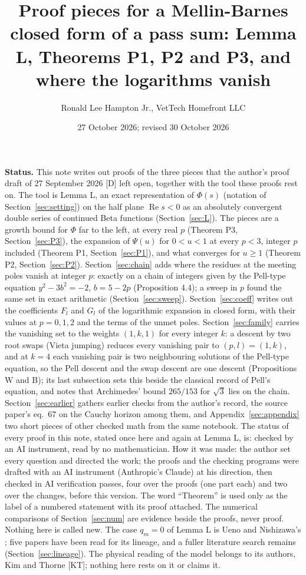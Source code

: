 \documentclass[11pt]{article}
\title{Proof pieces for a Mellin-Barnes closed form of a pass sum: Lemma L, Theorems P1, P2 and P3, and where the logarithms vanish}
\author{Ronald Lee Hampton Jr., VetTech Homefront LLC}
\date{27 October 2026; revised 30 October 2026}
\newcommand{\re}{\operatorname{Re}}
\begin{document}
\maketitle

\noindent\textbf{Status.} This note writes out proofs of the three pieces that the author's proof draft of 27 September 2026 [D] left open, together with the tool these proofs rest on. The tool is Lemma L, an exact representation of $\Phi(s)$ (notation of Section~\ref{sec:setting}) on the half plane $\re s<0$ as an absolutely convergent double series of continued Beta functions (Section~\ref{sec:L}). The pieces are a growth bound for $\Phi$ far to the left, at every real $p$ (Theorem P3, Section~\ref{sec:P3}), the expansion of $\Psi(u)$ for $0<u<1$ at every $p<3$, integer $p$ included (Theorem P1, Section~\ref{sec:P1}), and what converges for $u\ge1$ (Theorem P2, Section~\ref{sec:P2}). Section~\ref{sec:chain} adds where the residues at the meeting poles vanish at integer $p$: exactly on a chain of integers given by the Pell-type equation $y^2-3b^2=-2$, $b=5-2p$ (Proposition 4.4); a sweep in $p$ found the same set in exact arithmetic (Section~\ref{sec:sweep}). Section~\ref{sec:coeff} writes out the coefficients $F_l$ and $G_l$ of the logarithmic expansion in closed form, with their values at $p=0,1,2$ and the terms of the unmet poles. Section~\ref{sec:family} carries the vanishing set to the weights $(1,k,1)$ for every integer $k$: a descent by two root swaps (Vieta jumping) reduces every vanishing pair to $(p,l)=(1,k)$, and at $k=4$ each vanishing pair is two neighbouring solutions of the Pell-type equation, so the Pell descent and the swap descent are one descent (Propositions W and B); its last subsection sets this beside the classical record of Pell's equation, and notes that Archimedes' bound $265/153$ for $\sqrt3$ lies on the chain. Section~\ref{sec:earlier} gathers earlier checks from the author's record, the source paper's eq.~67 on the Cauchy horizon among them, and Appendix~\ref{sec:appendix} two short pieces of other checked math from the same notebook. The status of every proof in this note, stated once here and again at Lemma L, is: checked by an AI instrument, read by no mathematician. How it was made: the author set every question and directed the work; the proofs and the checking programs were drafted with an AI instrument (Anthropic's Claude) at his direction, then checked in AI verification passes, four over the proofs (one part each) and two over the changes, before this version. The word ``Theorem'' is used only as the label of a numbered statement with its proof attached. The numerical comparisons of Section~\ref{sec:num} are evidence beside the proofs, never proof. Nothing here is called new. The case $q_m=0$ of Lemma L is Ueno and Nishizawa's \cite{UN}; five papers have been read for its lineage, and a fuller literature search remains (Section~\ref{sec:lineage}). The physical reading of the model belongs to its authors, Kim and Thorne [KT]; nothing here rests on it or claims it.
\end{document}
